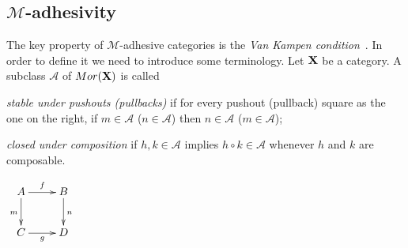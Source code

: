 \documentclass[a4paper,UKenglish,cleveref,pdftex,thm-restate,numberwithinsect]{lipics-v2021}
\newcommand{\mor}{\mathsf{Mor}}
\newcommand{\mon}{\mathsf{Mono}}
\newcommand{\reg}{\mathsf{Reg}}
\def\C{\textbf {\textup{C}}}
\def\X{\textbf {\textup{X}}}
\begin{document}





\subsection{$\mathcal{M}$-adhesivity}\label{subsec:ade}
The key property of $\mathcal{M}$-adhesive categories is the \emph{Van Kampen condition}~\cite{brown1997van,johnstone2007quasitoposes,lack2005adhesive}. %
In order to define it we need to introduce some terminology.
%
  Let  $\X$ be a category. A subclass $\mathcal{A}$ of
  $\mor(\X)$ is called %
  \begin{itemize}
    \parbox{11cm}{\item
      \emph{stable under pushouts (pullbacks)} if for every pushout (pullback) square as the one on the right, 	if $m \in \mathcal{A}$ ($n\in \mathcal{A}$) then $n \in \mathcal{A}$ ($m \in \mathcal{A}$);
    \item \emph{closed under composition} if $h, k\in \mathcal{A}$ implies $h\circ k\in \mathcal{A}$ whenever $h$ and $k$ are composable.{\tiny }}\hfill
    \parbox{2cm}{$\xymatrix{A\ar[r]^f  \ar[d]_{m}& B \ar[d]^n \\ C \ar[r]_g & D}$}
    \parbox{11cm}{}\hfill
  \end{itemize}
\end{document}

